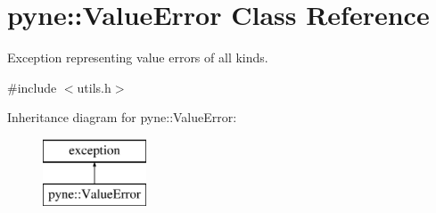 \hypertarget{classpyne_1_1_value_error}{}\section{pyne\+:\+:Value\+Error Class Reference}
\label{classpyne_1_1_value_error}


Exception representing value errors of all kinds.  




{\ttfamily \#include $<$utils.\+h$>$}

Inheritance diagram for pyne\+:\+:Value\+Error\+:\begin{figure}[H]
\begin{center}
\leavevmode
\includegraphics[height=2.000000cm]{classpyne_1_1_value_error}
\end{center}
\end{figure}
